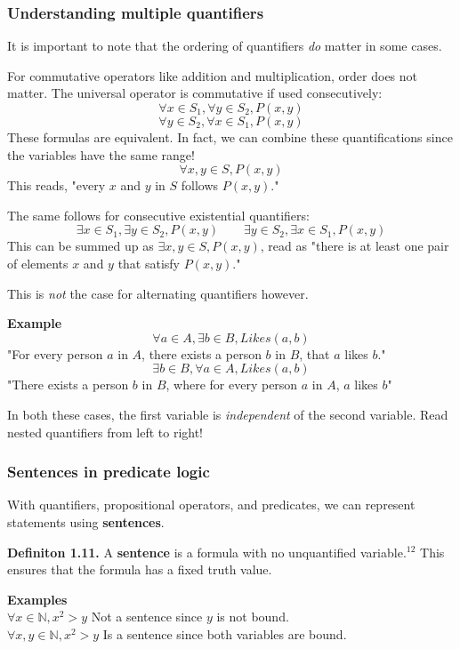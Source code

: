 \documentclass{article}
\begin{document}
\subsubsection*{Understanding multiple quantifiers}
It is important to note that the ordering of quantifiers \emph{do} matter in
some cases.

For commutative operators like addition and multiplication, order does not
matter. The universal operator is commutative if used consecutively:
$$\forall x \in S_1, \forall y \in S_2, P(x, y)$$
$$\forall y \in S_2, \forall x \in S_1, P(x, y)$$
These formulas are equivalent. In fact, we can combine these quantifications
since the variables have the same range!
$$\forall x, y \in S, P(x, y)$$
This reads, "every $x$ and $y$ in $S$ follows $P(x, y)$."

The same follows for consecutive existential quantifiers:
$$\exists x \in S_1, \exists y \in S_2, P(x, y) \quad \quad 
\exists y \in S_2, \exists x \in S_1, P(x, y)$$
This can be summed up as $\exists x, y \in S, P(x, y)$, read as 
"there is at least one pair of elements $x$ and $y$ that satisfy $P(x,y)$."

This is \emph{not} the case for alternating quantifiers however.

\textbf{Example}
$$\forall a \in A, \exists b \in B, Likes(a, b)$$
"For every person $a$ in $A$, there exists a person $b$ in $B$, that $a$ likes $b$."
$$\exists b \in B, \forall a \in A, Likes(a, b)$$
"There exists a person $b$ in $B$, where for every person $a$ in $A$, $a$ likes $b$"

In both these cases, the first variable is \emph{independent} of the
second variable. Read nested quantifiers from left to right!

\subsubsection*{Sentences in predicate logic}
With quantifiers, propositional operators, and predicates, we can represent 
statements using \textbf{sentences}.

\textbf{Definiton 1.11.} A \textbf{sentence} is a formula with no unquantified 
\newline variable.$^{12}$ This ensures that the formula has a fixed truth value.

\textbf{Examples} \\
$\forall x \in \mathbb{N}, x^2 > y$ \hfill Not a sentence since $y$ is not bound. \\
$\forall x, y \in \mathbb{N}, x^2 > y$ \hfill Is a sentence since both variables are bound. 
\end{document}
